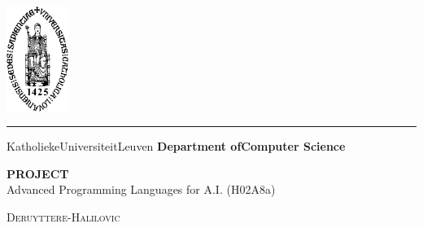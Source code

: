 \documentclass{report}
\begin{document}
\lstset{language=Prolog}          %

\begin{titlepage}
	\newpage
	\thispagestyle{empty}
	\frenchspacing
	\hspace{-0.2cm}
	\includegraphics[height=3.4cm]{sedes}
	\hspace{0.2cm}
	\rule{0.5pt}{3.4cm}
	\hspace{0.2cm}
	\begin{minipage}[b]{8cm}
		\Large{Katholieke\newline Universiteit\newline Leuven}\smallskip\newline
		\large{}\smallskip\newline
		\textbf{Department of\newline Computer Science}\smallskip
	\end{minipage}
	\vspace*{3.2cm}\vfill
	\begin{center}
		\begin{minipage}[t]{\textwidth}
			\begin{center}
				\LARGE{\rm{\textbf{\uppercase{Project}}}}\\
				\Large{\rm{Advanced Programming Languages for A.I. (H02A8a) }}\\
				\vspace{0.5cm}

			    \large{\textsc{Deruyttere-Halilovic}}%

			\end{center}
		\end{minipage}
	\end{center}
	\vfill
	\hfill{}
\end{titlepage}
\end{document}

